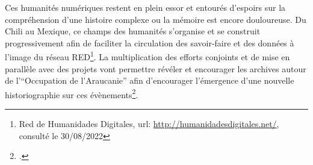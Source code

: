 Ces humanités numériques  restent en plein essor et entourés d'espoirs sur la compréhension d'une histoire complexe ou la mémoire est encore douloureuse. Du Chili au Mexique, ce champs des humanités s'organise et se construit progressivement afin de faciliter la circulation des savoir-faire et des données à l'image du réseau RED\footnote{Red de Humanidades Digitales, url: \url{http://humanidadesdigitales.net/}, consulté le 30/08/2022}. La multiplication des efforts conjoints et de mise en parallèle avec des projets vont permettre révéler et encourager les archives autour de l'\enquote{Occupation de l'Araucanie} afin d'encourager l'émergence d'une nouvelle historiographie sur ces évènements\footcite{canalestapiaHistoriografiaMapucheBalances2015}.

